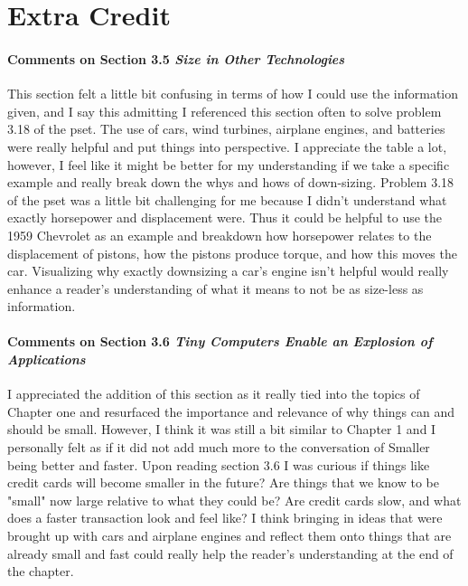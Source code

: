 \documentclass[10pt]{article}
\begin{document}
\section{Extra Credit}

\paragraph{Comments on Section 3.5 \textit{Size in Other Technologies}} 
This section felt a little bit confusing in terms of how I could use the information given, and I say this admitting I referenced this section often to solve
problem 3.18 of the pset. The use of cars, wind turbines, airplane engines, and batteries were really helpful and put things into perspective. I appreciate the table a lot, however, I feel like 
it might be better for my understanding if we take a specific example and really break down the whys and hows of down-sizing. Problem 3.18 of the pset was a little bit challenging for me
because I didn't understand what exactly horsepower and displacement were. Thus it could be helpful to use the 1959 Chevrolet as an example and breakdown how horsepower relates to the displacement of pistons, 
how the pistons produce torque, and how this moves the car. Visualizing why exactly downsizing a car's engine isn't helpful would really enhance a reader's understanding of what it means to not be as size-less as information. 

\paragraph{Comments on Section 3.6 \textit{Tiny Computers Enable an Explosion of Applications}}
I appreciated the addition of this section as it really tied into the topics of Chapter one and resurfaced the importance and relevance of why things can and should be small. However, 
I think it was still a bit similar to Chapter 1 and I personally felt as if it did not add much more to the conversation of Smaller being better and faster. Upon reading section 3.6 
I was curious if things like credit cards will become smaller in the future? Are things that we know to be "small" now large relative to what they could be? Are credit cards slow, and what does a 
faster transaction look and feel like? I think bringing in ideas that were brought up with cars and airplane engines and reflect them onto things that are already small and fast could really help the 
reader's understanding at the end of the chapter. 
\end{document}

